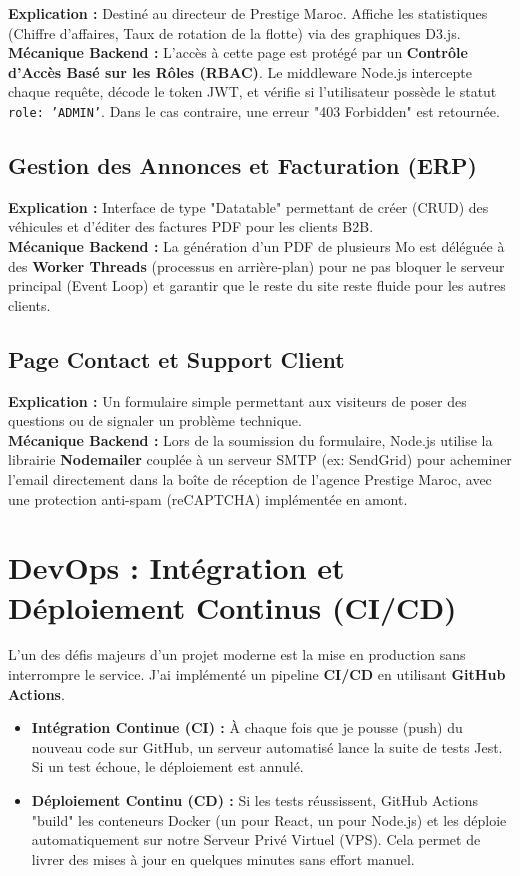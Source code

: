 \textbf{Explication :} Destiné au directeur de Prestige Maroc. Affiche les statistiques (Chiffre d'affaires, Taux de rotation de la flotte) via des graphiques D3.js. \\
\textbf{Mécanique Backend :} L'accès à cette page est protégé par un \textbf{Contrôle d'Accès Basé sur les Rôles (RBAC)}. Le middleware Node.js intercepte chaque requête, décode le token JWT, et vérifie si l'utilisateur possède le statut \texttt{role: 'ADMIN'}. Dans le cas contraire, une erreur "403 Forbidden" est retournée.

\subsection{Gestion des Annonces et Facturation (ERP)}

\textbf{Explication :} Interface de type "Datatable" permettant de créer (CRUD) des véhicules et d'éditer des factures PDF pour les clients B2B. \\
\textbf{Mécanique Backend :} La génération d'un PDF de plusieurs Mo est déléguée à des \textbf{Worker Threads} (processus en arrière-plan) pour ne pas bloquer le serveur principal (Event Loop) et garantir que le reste du site reste fluide pour les autres clients.

\subsection{Page Contact et Support Client}

\textbf{Explication :} Un formulaire simple permettant aux visiteurs de poser des questions ou de signaler un problème technique. \\
\textbf{Mécanique Backend :} Lors de la soumission du formulaire, Node.js utilise la librairie \textbf{Nodemailer} couplée à un serveur SMTP (ex: SendGrid) pour acheminer l'email directement dans la boîte de réception de l'agence Prestige Maroc, avec une protection anti-spam (reCAPTCHA) implémentée en amont.

\section{DevOps : Intégration et Déploiement Continus (CI/CD)}
L'un des défis majeurs d'un projet moderne est la mise en production sans interrompre le service. J'ai implémenté un pipeline \textbf{CI/CD} en utilisant \textbf{GitHub Actions}.
\begin{itemize}
    \item \textbf{Intégration Continue (CI) :} À chaque fois que je pousse (push) du nouveau code sur GitHub, un serveur automatisé lance la suite de tests Jest. Si un test échoue, le déploiement est annulé.
    \item \textbf{Déploiement Continu (CD) :} Si les tests réussissent, GitHub Actions "build" les conteneurs Docker (un pour React, un pour Node.js) et les déploie automatiquement sur notre Serveur Privé Virtuel (VPS). Cela permet de livrer des mises à jour en quelques minutes sans effort manuel.
\end{itemize}
